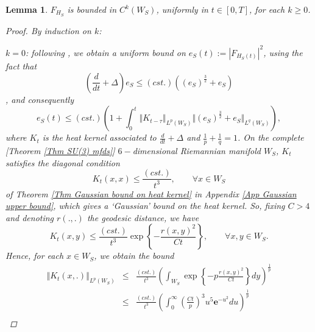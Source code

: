 \documentclass{article}
\newcommand{\e}[1]{\mathbf{e}^{#1}}
\newtheorem{lemma}[theorem]{Lemma}
\begin{document}
\begin{lemma}   \label{Lemma all derivatives of F are unif bounded}
$F_{H_{S}}$ is bounded in $C^k\left( W_{S}\right) $, uniformly in $t\in[0,T] $, for each $k\geq 0$.
\begin{proof}
By induction on $k$:

\underline{$k=0$}: following \cite[Lemma 18]{ASDYM}, we obtain a uniform
bound on $e_S(t):= \left\vert F_{H_{S}\left( t\right)
}\right\vert ^{2}$, using the fact that 
\begin{equation*}
\left( \frac{d}{dt}+\Delta \right) e_{S}\leq \left( cst.\right) \left( (e_{S})^{\frac{3%
}{2}}+e_{S}\right)
\end{equation*}%
\cite[Proposition 16, (ii)]{ASDYM}, and consequently%
\begin{equation}
e_{S}\left( t\right) \leq \left( cst.\right) \left( 1+\int_{0}^{t}\left\Vert
K_{t-\tau }\right\Vert _{L^{p}\left( W_{S}\right) }\Vert \left(e_S\right)^{\frac{3}{2}%
}+e_S\Vert _{L^{q}\left( W_{S}\right) }\right) ,
\label{Eq heat bound on e}
\end{equation}%
where $K_{t}$ is the heat kernel associated to $\frac{d}{dt}+\Delta $ and $%
\frac{1}{p}+\frac{1}{q}=1$. On the complete [\emph{Theorem \ref{Thm
SU(3) mfds}}] $6-$dimensional Riemannian manifold $W_{S}$, $K_{t}$ satisfies 
\cite[\S 9]{Eels and Sampson} the diagonal condition%
\begin{equation*}
K_{t}\left( x,x\right) \leq \frac{\left( cst.\right) }{t^{3}},\qquad \forall
x\in W_{S}
\end{equation*}%
of \emph{Theorem \ref{Thm Gaussian bound on heat kernel}} in Appendix \ref{App Gaussian upper bound}, which gives a `Gaussian' bound on the heat kernel. So, fixing $C>4$ and denoting $%
r\left( .,.\right) $ the geodesic distance, we have 
\begin{equation*}
K_{t}\left( x,y\right) \leq \frac{\left( cst.\right) }{t^{3}}\exp \left\{ -%
\frac{r\left( x,y\right) ^{2}}{Ct}\right\} ,\qquad \forall x,y\in W_{S}.
\end{equation*}%
Hence, for each $x\in W_{S}$, we obtain the bound%
\begin{eqnarray*}
\left\Vert K_{t}\left( x,.\right) \right\Vert _{L^{p}\left( W_{S}\right) }
&\leq &\frac{\left( cst.\right) }{t^{3}}\left( \int_{W_{S}}\exp \left\{ -p%
\frac{r\left( x,y\right) ^{2}}{Ct}\right\} dy\right) ^{\frac{1}{p}} \\
&\leq &\frac{\left( cst.\right) }{t^{3}}\left( \int_{0}^{\infty }\left( 
\tfrac{Ct}{p}\right) ^{3}u^{5}\e{-u^{2}}du\right) ^{\frac{1}{p}} \\

\end{eqnarray*}
\end{proof}
\end{lemma}
\end{document}
